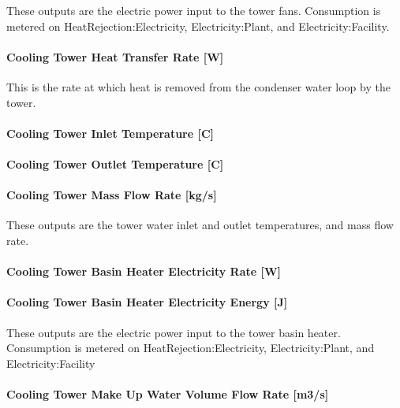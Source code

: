 These outputs are the electric power input to the tower fans. Consumption is metered on HeatRejection:Electricity, Electricity:Plant, and Electricity:Facility.

\paragraph{Cooling Tower Heat Transfer Rate {[}W{]}}\label{cooling-tower-heat-transfer-rate-w-1}

This is the rate at which heat is removed from the condenser water loop by the tower.

\paragraph{Cooling Tower Inlet Temperature {[}C{]}}\label{cooling-tower-inlet-temperature-c-1}

\paragraph{Cooling Tower Outlet Temperature {[}C{]}}\label{cooling-tower-outlet-temperature-c-1}

\paragraph{Cooling Tower Mass Flow Rate {[}kg/s{]}}\label{cooling-tower-mass-flow-rate-kgs-1}

These outputs are the tower water inlet and outlet temperatures, and mass flow rate.

\paragraph{Cooling Tower Basin Heater Electricity Rate {[}W{]}}\label{cooling-tower-basin-heater-electric-power-w-1}

\paragraph{Cooling Tower Basin Heater Electricity Energy {[}J{]}}\label{cooling-tower-basin-heater-electric-energy-j-1}

These outputs are the electric power input to the tower basin heater. Consumption is metered on HeatRejection:Electricity, Electricity:Plant, and Electricity:Facility

\paragraph{Cooling Tower Make Up Water Volume Flow Rate {[}m3/s{]}}\label{cooling-tower-make-up-water-volume-flow-rate-m3s-1}

